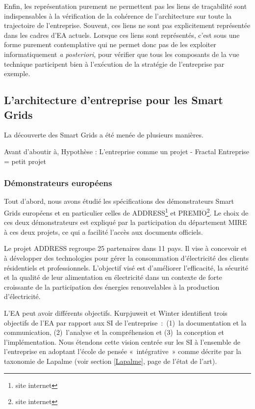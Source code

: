 	Enfin, les représentation purement  ne permettent pas les liens de traçabilité 
sont indispensables à la vérification de la cohérence de l'architecture sur 
toute la trajectoire de l'entreprise. Souvent, ces liens ne sont pas 
explicitement représentée dans les cadres d'EA actuels. Lorsque ces liens sont 
représentés, c'est sous une forme purement contemplative qui ne permet donc pas 
de les exploiter informatiquement \textit{a posteriori}, pour vérifier que tous 
les composants de la vue technique participent bien à l'exécution de la 
stratégie de l'entreprise par exemple. 
	
	\subsection{L'architecture d'entreprise pour les Smart Grids}
	
La découverte des Smart Grids a été menée de plusieurs manières.

Avant d'aboutir à, Hypothèse : L'entreprise comme un projet - Fractal
Entreprise = petit projet
 
\subsubsection{Démonstrateurs européens}

Tout d'abord, nous avons étudié les spécifications des démonstrateurs Smart 
Grids européens et en particulier celles de ADDRESS\footnote{site internet} et 
PREMIO\footnote{site internet}. Le choix de ces deux démonstrateurs est expliqué 
par la participation du département MIRE à ces deux projets, ce qui a facilité 
l'accès aux documents officiels. 

Le projet ADDRESS regroupe 25 partenaires dans 11 pays. Il vise à concevoir et à 
développer des technologies pour gérer la consommation d'électricité des clients 
résidentiels et professionnels. L'objectif visé est d'améliorer l'efficacité, la 
sécurité et la qualité de leur alimentation en électricité dans un contexte de 
forte croissante de la participation des énergies renouvelables à la production 
d'électricité. 

L'EA peut avoir différents objectifs. Kurpjuweit et Winter \cite{kurpjuweit2007viewpoint} identifient trois objectifs de l'EA par rapport aux SI de l'entreprise~:~(1)~la documentation et la communication, (2)~l'analyse et la compréhension et (3)~la conception et l'implémentation. Nous étendons cette vision centrée sur les SI à l'ensemble de l'entreprise en adoptant l'école de pensée «~intégrative~» comme décrite par la taxonomie de Lapalme (voir section \ref{Lapalme}, page \pageref{Lapalme} de l'état de l'art). 

